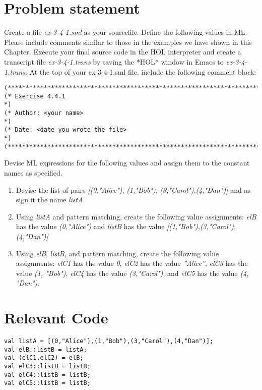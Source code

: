 \documentclass{report}
\begin{document}
\section{Problem statement}
\label{problem-statement-3-4-1}
Create a file \emph{ex-3-4-1.sml} as your sourcefile. Define the following values in ML. Please include comments similar to those in the examples we have shown in this Chapter. Execute your final source
code in the HOL interpreter and create a transcript file \emph{ex-3-4-1.trans} by saving the *HOL* window in Emacs to \emph{ex-3-4-1.trans}.
At the top of your ex-3-4-1.sml file, include the following comment block:
\begin{lstlisting}[frame=shadowbox]
(************************************************************************)
(* Exercise 4.4.1														*)
(* Author: <your name>													*)
(* Date: <date you wrote the file>										*)
(************************************************************************)

\end{lstlisting}
Devise ML expressions for the following values and assign them to the constant names as specified.
\begin{enumerate}[a]
	\item Devise the list of pairs \emph{[(0,"Alice")}, \emph{(1,"Bob")}, \emph{(3,"Carol")},\emph{(4,"Dan")]} and as-sign it the name \emph{listA}.
	\item Using \emph{listA} and pattern matching, create the following value assignments: \emph{elB} has the value \emph{(0,"Alice")}
and \emph{listB} has the value \emph{[(1,"Bob")},\emph{(3,"Carol")},\emph{(4,"Dan")]}
	\item Using \emph{elB}, \emph{listB}, and pattern matching, create the following value assignments: \emph{elC1} has the value \emph{0}, \emph{elC2} has the value \emph{”Alice”}, \emph{elC3} has the value \emph{(1, "Bob")}, \emph{elC4} has the value \emph{(3,"Carol")}, and \emph{elC5} has the value \emph{(4, "Dan")}.
\end{enumerate}

\section{Relevant Code}
\label{rel-code-3-4-1}
\begin{lstlisting}[frame=TB]
val listA = [(0,"Alice"),(1,"Bob"),(3,"Carol"),(4,"Dan")];
val elB::listB = listA;
val (elC1,elC2) = elB;
val elC3::listB = listB;
val elC4::listB = listB;
val elC5::listB = listB;
\end{lstlisting}
\end{document}
